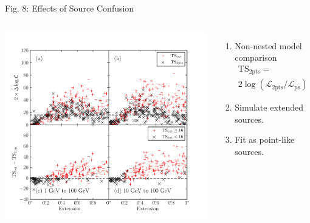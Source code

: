 \documentclass[12pt]{beamer}
\begin{document}
\begin{frame}{Fig. 8: Effects of Source Confusion}
  \begin{columns}
    \includegraphics[scale=0.50]{plots/confusion_extended_plot_color.pdf}
    \begin{enumerate}
      \item Non-nested model comparison
        \begin{multline*}
          \text{TS}_\text{2pts} =  \\
          2 \log(\mathcal{L}_\text{2pts}/\mathcal{L}_\text{ps})
        \end{multline*}
      \item Simulate extended sources. 
      \item Fit as point-like sources.
    \end{enumerate}
  \end{columns}
\end{frame}
\end{document}
